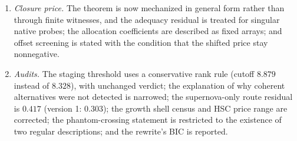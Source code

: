 \begin{enumerate}
  \([0,u_\infty)\); erasure is an imposed rule at turnaround; and the
  tag distribution affects the record probability.
\item
  \emph{Closure price.} The theorem is now mechanized in general form
  rather than through finite witnesses, and the adequacy residual is
  treated for singular native probes; the allocation coefficients are
  described as fixed arrays; and offset screening is stated with the
  condition that the shifted price stay nonnegative.
\item
  \emph{Audits.} The staging threshold uses a conservative rank rule
  (cutoff \(8.879\) instead of \(8.328\)), with unchanged verdict; the
  explanation of why coherent alternatives were not detected is
  narrowed; the supernova-only route residual is \(0.417\) (version 1:
  \(0.303\)); the growth shell census and HSC price range are corrected;
  the phantom-crossing statement is restricted to the existence of two
  regular descriptions; and the rewrite's BIC is reported.
\end{enumerate}

